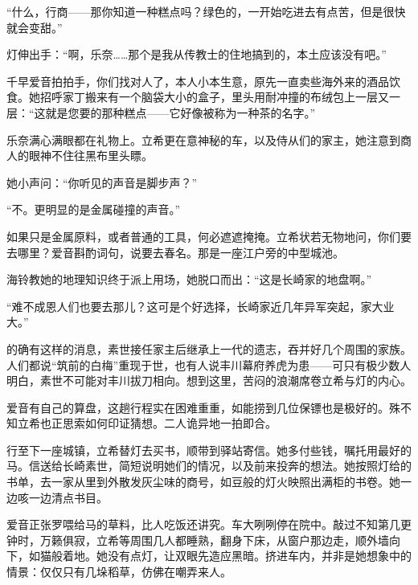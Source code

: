 \documentclass{article}
\begin{document}
“什么，行商——那你知道一种糕点吗？绿色的，一开始吃进去有点苦，但是很快就会变甜。”



灯伸出手：“啊，乐奈……那个是我从传教士的住地搞到的，本土应该没有吧。”



千早爱音拍拍手，你们找对人了，本人小本生意，原先一直卖些海外来的酒品饮食。她招呼家丁搬来有一个脑袋大小的盒子，里头用耐冲撞的布绒包上一层又一层：“这就是您要的那种糕点——它好像被称为一种茶的名字。”



乐奈满心满眼都在礼物上。立希更在意神秘的车，以及侍从们的家主，她注意到商人的眼神不住往黑布里头瞟。



她小声问：“你听见的声音是脚步声？”



“不。更明显的是金属碰撞的声音。”



如果只是金属原料，或者普通的工具，何必遮遮掩掩。立希状若无物地问，你们要去哪里？爱音斟酌词句，说要去春名。那是一座江户旁的中型城池。



海铃教她的地理知识终于派上用场，她脱口而出：“这是长崎家的地盘啊。”



“难不成恩人们也要去那儿？这可是个好选择，长崎家近几年异军突起，家大业大。”



的确有这样的消息，素世接任家主后继承上一代的遗志，吞并好几个周围的家族。人们都说“筑前的白梅”重现于世，也有人说丰川幕府养虎为患——可只有极少数人明白，素世不可能对丰川拔刀相向。想到这里，苦闷的浪潮席卷立希与灯的内心。



爱音有自己的算盘，这趟行程实在困难重重，如能捞到几位保镖也是极好的。殊不知立希也正思索如何印证猜想。二人诡异地一拍即合。



行至下一座城镇，立希替灯去买书，顺带到驿站寄信。她多付些钱，嘱托用最好的马。信送给长崎素世，简短说明她们的情况，以及前来投奔的想法。她按照灯给的书单，去一家从里到外散发灰尘味的商号，如豆般的灯火映照出满柜的书卷。她一边咳一边清点书目。



爱音正张罗喂给马的草料，比人吃饭还讲究。车大咧咧停在院中。敲过不知第几更钟时，万籁俱寂，立希等周围几人都睡熟，翻身下床，从窗户那边走，顺外墙向下，如猫般着地。她没有点灯，让双眼先造应黑暗。挤进车内，并非是她想象中的情景：仅仅只有几垛稻草，仿佛在嘲弄来人。
\end{document}
